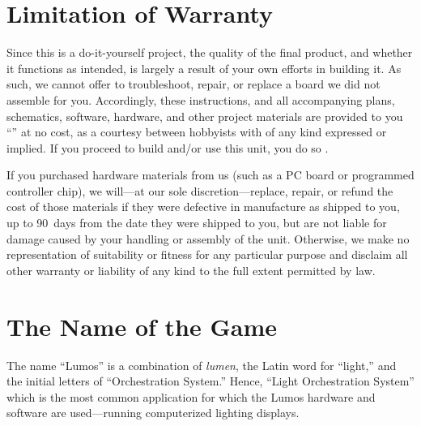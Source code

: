 \documentclass[letterpaper,twoside,onecolumn,openright,final]{memoir}
\begin{document}
\section{Limitation of Warranty}
Since this is a do-it-yourself project, the quality of the final product, and whether it 
functions as intended, is largely a result of your own efforts in building it.  As such, we
cannot offer to troubleshoot, repair, or replace a board we did not assemble for you.  Accordingly,
these instructions, and all accompanying plans, schematics, software, hardware, and other
project materials are provided to you ``'' at no cost, as a courtesy between 
 hobbyists with  of any kind expressed or implied.  If you proceed
to build and/or use this unit, you do so .

If you purchased hardware materials from us (such as a PC board or programmed controller chip),
we will---at our sole discretion---replace, repair, or refund the cost of those materials if they were defective in manufacture
as shipped to you, up to 90~days from the date they were shipped to you, 
but are not liable for damage caused by your handling or assembly of the unit.
Otherwise, we make no representation of suitability or fitness for any particular purpose and disclaim
all other warranty or liability of any kind to the full extent permitted by law.


%


\section{The Name of the Game}
The name ``Lumos'' is a combination of \emph{lumen}, the Latin word for ``light,''
and the initial letters of ``Orchestration System.''  Hence, ``Light Orchestration System''
which is the most common application for which the Lumos hardware and software are used---running
computerized lighting displays.
\end{document}
